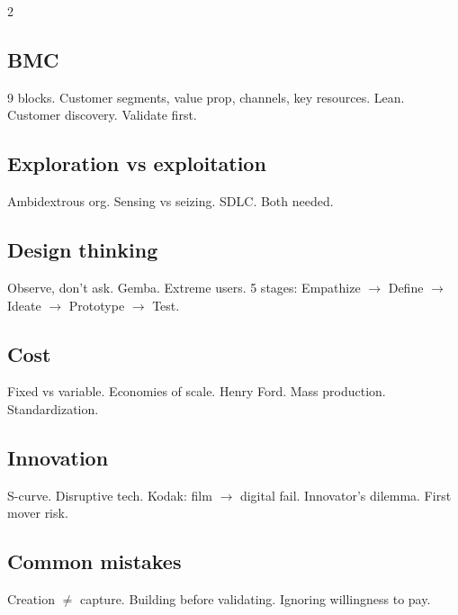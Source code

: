 \documentclass[10pt,landscape,a4paper]{article}
\begin{document}
\begin{multicols}{2}
\subsection*{\color{accent} BMC}
9 blocks. Customer segments, value prop, channels, key resources. Lean. Customer discovery. Validate first.

\subsection*{\color{accent} Exploration vs exploitation}
Ambidextrous org. Sensing vs seizing. SDLC. Both needed.

\subsection*{\color{accent} Design thinking}
Observe, don't ask. Gemba. Extreme users. 5 stages: Empathize $\to$ Define $\to$ Ideate $\to$ Prototype $\to$ Test.

\subsection*{\color{accent} Cost}
Fixed vs variable. Economies of scale. Henry Ford. Mass production. Standardization.

\subsection*{\color{accent} Innovation}
S-curve. Disruptive tech. Kodak: film $\to$ digital fail. Innovator's dilemma. First mover risk.

\subsection*{\color{accent} Common mistakes}
Creation $\neq$ capture. Building before validating. Ignoring willingness to pay.
\end{multicols}
\end{document}
